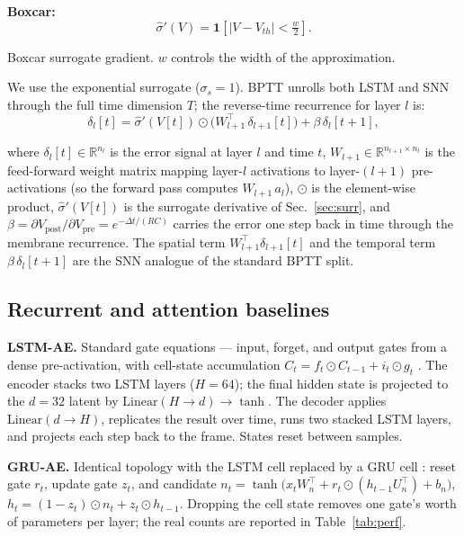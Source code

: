 \documentclass[conference]{IEEEtran}
\begin{document}
\textbf{Boxcar:}
\begin{equation}
  \hat{\sigma}'(V) = \mathbf{1}\!\left[|V - V_{th}| < \tfrac{w}{2}\right].
\end{equation}
\par Boxcar surrogate gradient.  $w$ controls the width of the approximation.

\par We use the exponential surrogate ($\sigma_s=1$).
BPTT \cite{werbos1990backpropagation} unrolls both LSTM and SNN through the
full time dimension $T$; the reverse-time recurrence for layer $l$ is:
\begin{equation}
  \delta_l[t] = \hat{\sigma}'(V[t]) \odot \big(W_{l+1}^{\top}\,\delta_{l+1}[t]\big)
              + \beta\,\delta_l[t+1],
  \label{eq:bptt}
\end{equation}
\par where $\delta_l[t]\in\mathbb{R}^{n_l}$ is the error signal at layer $l$ and time
$t$, $W_{l+1}\in\mathbb{R}^{n_{l+1}\times n_l}$ is the feed-forward weight matrix mapping
layer-$l$ activations to layer-$(l+1)$ pre-activations (so the forward pass computes
$W_{l+1}\,a_l$), $\odot$ is the element-wise product, $\hat{\sigma}'(V[t])$ is the
surrogate derivative of Sec.~\ref{sec:surr}, and $\beta=\partial V_{\mathrm{post}}/\partial
V_{\mathrm{pre}}=e^{-\Delta t/(RC)}$ carries the error one step back in time through the
membrane recurrence. The spatial term $W_{l+1}^{\top}\delta_{l+1}[t]$ and the temporal
term $\beta\,\delta_l[t+1]$ are the SNN analogue of the standard BPTT split.

\subsection{Recurrent and attention baselines}
\label{sec:baselines}

\par \textbf{LSTM-AE.} Standard gate equations --- input, forget, and output
gates from a dense pre-activation, with cell-state accumulation
$C_t = f_t \odot C_{t-1} + i_t \odot g_t$ \cite{hochreiter1997long,greff2017lstm}.
The encoder stacks two LSTM layers ($H=64$); the final hidden state is projected
to the $d=32$ latent by $\mathrm{Linear}(H\to d)\to\tanh$. The decoder applies
$\mathrm{Linear}(d\to H)$, replicates the result over time, runs two stacked
LSTM layers, and projects each step back to the frame. States reset between
samples.

\par \textbf{GRU-AE.} Identical topology with the LSTM cell replaced by a GRU
cell \cite{cho2014gru,chung2014gru}: reset gate $r_t$, update gate $z_t$, and
candidate $n_t = \tanh\!\big(x_t W_n^\top + r_t \odot (h_{t-1} U_n^\top) + b_n\big)$,
$h_t = (1-z_t)\odot n_t + z_t \odot h_{t-1}$. Dropping the cell state removes one
gate's worth of parameters per layer; the real counts are reported in
Table~\ref{tab:perf}.
\end{document}

